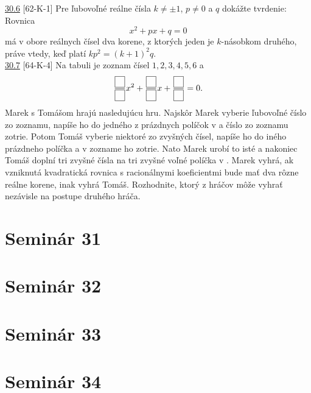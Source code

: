 \noindent \ul{30.6} [62-K-1] Pre ľubovoľné reálne čísla $k\neq \pm 1$, $p \neq 0$ a $q$ dokážte tvrdenie: Rovnica
$$x^2+ px + q = 0$$
má v obore reálnych čísel dva korene, z ktorých jeden je $k$-násobkom druhého, práve vtedy, keď platí $kp^2 = (k + 1)^2 q$.\\

\noindent \ul{30.7} [64-K-4]  Na tabuli je zoznam čísel $1, 2, 3, 4, 5, 6$ a 
$$\frac{\fbox{$\phantom{7}$}}{\fbox{$\phantom{7}$}}x^2+\frac{\fbox{$\phantom{7}$}}{\fbox{$\phantom{7}$}}x + \frac{\fbox{$\phantom{7}$}}{\fbox{$\phantom{7}$}}= 0.$$
Marek s Tomášom hrajú nasledujúcu hru. Najskôr Marek vyberie ľubovoľné číslo zo zoznamu, napíše ho do jedného z prázdnych políčok v  a číslo zo zoznamu zotrie. Potom Tomáš vyberie niektoré zo zvyšných čísel, napíše ho do iného prázdneho políčka a v zozname ho zotrie. Nato Marek urobí to isté a nakoniec Tomáš doplní tri zvyšné čísla na tri zvyšné voľné políčka v . Marek vyhrá, ak vzniknutá kvadratická rovnica s racionálnymi koeficientmi bude mať dva rôzne reálne korene, inak vyhrá Tomáš. Rozhodnite, ktorý z hráčov môže vyhrať nezávisle na postupe druhého
hráča.\\

\section*{Seminár 31}

\section*{Seminár 32}

\section*{Seminár 33}

\section*{Seminár 34}

